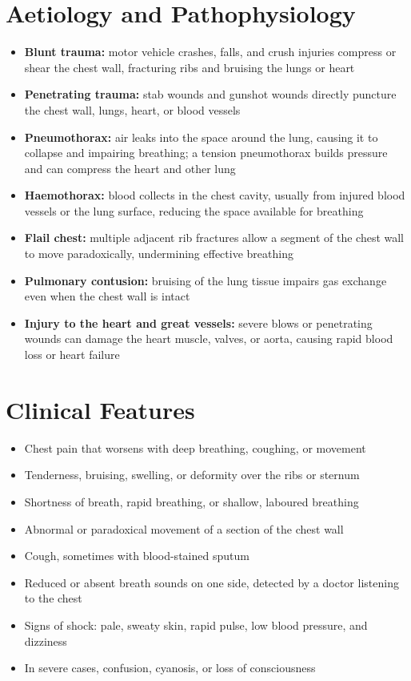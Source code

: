 \section*{Aetiology and Pathophysiology}
\begin{itemize}
    \item \textbf{Blunt trauma:} motor vehicle crashes, falls, and crush injuries compress or shear the chest wall, fracturing ribs and bruising the lungs or heart
    \item \textbf{Penetrating trauma:} stab wounds and gunshot wounds directly puncture the chest wall, lungs, heart, or blood vessels
    \item \textbf{Pneumothorax:} air leaks into the space around the lung, causing it to collapse and impairing breathing; a tension pneumothorax builds pressure and can compress the heart and other lung
    \item \textbf{Haemothorax:} blood collects in the chest cavity, usually from injured blood vessels or the lung surface, reducing the space available for breathing
    \item \textbf{Flail chest:} multiple adjacent rib fractures allow a segment of the chest wall to move paradoxically, undermining effective breathing
    \item \textbf{Pulmonary contusion:} bruising of the lung tissue impairs gas exchange even when the chest wall is intact
    \item \textbf{Injury to the heart and great vessels:} severe blows or penetrating wounds can damage the heart muscle, valves, or aorta, causing rapid blood loss or heart failure
\end{itemize}

\section*{Clinical Features}
\begin{itemize}
    \item Chest pain that worsens with deep breathing, coughing, or movement
    \item Tenderness, bruising, swelling, or deformity over the ribs or sternum
    \item Shortness of breath, rapid breathing, or shallow, laboured breathing
    \item Abnormal or paradoxical movement of a section of the chest wall
    \item Cough, sometimes with blood-stained sputum
    \item Reduced or absent breath sounds on one side, detected by a doctor listening to the chest
    \item Signs of shock: pale, sweaty skin, rapid pulse, low blood pressure, and dizziness
    \item In severe cases, confusion, cyanosis, or loss of consciousness
\end{itemize}

